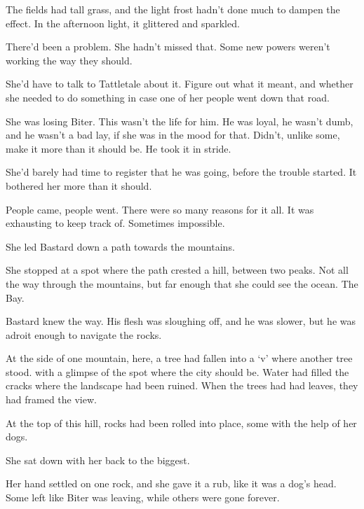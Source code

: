 The fields had tall grass, and the light frost hadn't done much to dampen the effect.  In the afternoon light, it glittered and sparkled.



There'd been a problem.  She hadn't missed that.  Some new powers weren't working the way they should.



She'd have to talk to Tattletale about it.  Figure out what it meant, and whether she needed to do something in case one of her people went down that road.



She was losing Biter.  This wasn't the life for him.  He was loyal, he wasn't dumb, and he wasn't a bad lay, if she was in the mood for that.  Didn't, unlike some, make it more than it should be.  He took it in stride.



She'd barely had time to register that he was going, before the trouble started.  It bothered her more than it should.



People came, people went.  There were so many reasons for it all.  It was exhausting to keep track of.  Sometimes impossible.



She led Bastard down a path towards the mountains.



She stopped at a spot where the path crested a hill, between two peaks.  Not all the way through the mountains, but far enough that she could see the ocean.  The Bay.



Bastard knew the way.  His flesh was sloughing off, and he was slower, but he was adroit enough to navigate the rocks.



At the side of one mountain, here, a tree had fallen into a `v' where another tree stood.  with a glimpse of the spot where the city should be.  Water had filled the cracks where the landscape had been ruined.  When the trees had had leaves, they had framed the view.



At the top of this hill, rocks had been rolled into place, some with the help of her dogs.



She sat down with her back to the biggest.



Her hand settled on one rock, and she gave it a rub, like it was a dog's head.  Some left like Biter was leaving, while others were gone forever.



